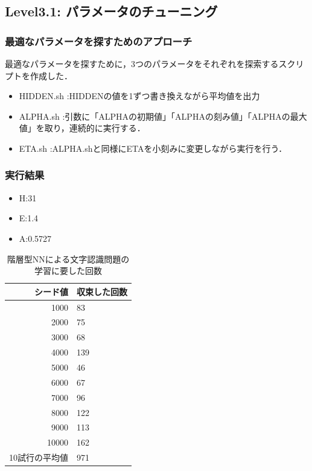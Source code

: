 \subsection{Level3.1: パラメータのチューニング}
\subsubsection{最適なパラメータを探すためのアプローチ}
最適なパラメータを探すために，3つのパラメータをそれぞれを探索するスクリプトを作成した．
\begin{itemize}
	\item HIDDEN.sh :HIDDENの値を1ずつ書き換えながら平均値を出力
	\item ALPHA.sh  :引数に「ALPHAの初期値」「ALPHAの刻み値」「ALPHAの最大値」を取り，連続的に実行する．
	\item ETA.sh    :ALPHA.shと同様にETAを小刻みに変更しながら実行を行う．
\end{itemize}

\subsubsection{実行結果}
\begin{itemize}
	\item H:31
	\item E:1.4
	\item A:0.5727
\end{itemize}

\begin{table}[htb]
 \begin{center}
  \caption{階層型NNによる文字認識問題の学習に要した回数}
  \label{table:level3}
  \begin{tabular}[htb]{r|l} \hline
   シード値 & 収束した回数 \\ \hline \hline
   1000 & 83 \\ \hline
   2000 & 75 \\ \hline
   3000 & 68 \\ \hline
   4000 & 139 \\ \hline
   5000 & 46 \\ \hline
   6000 & 67 \\ \hline
   7000 & 96 \\ \hline
   8000 & 122 \\ \hline
   9000 & 113 \\ \hline
   10000 & 162 \\ \hline \hline
   10試行の平均値 & 971 \\ \hline
  \end{tabular}
 \end{center}
\end{table}

